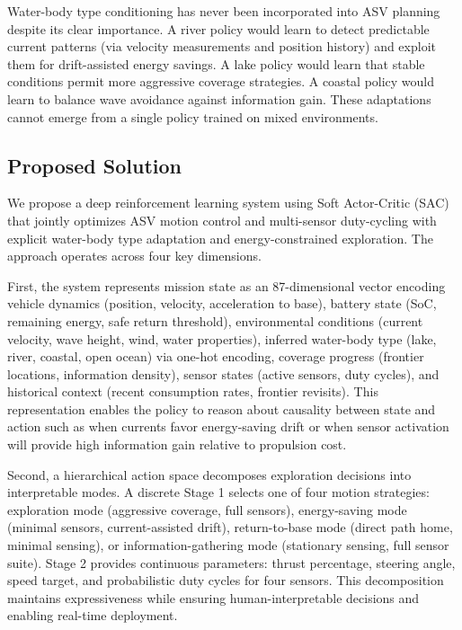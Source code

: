 Water-body type conditioning has never been incorporated into ASV planning despite its clear importance. A river policy would learn to detect predictable current patterns (via velocity measurements and position history) and exploit them for drift-assisted energy savings. A lake policy would learn that stable conditions permit more aggressive coverage strategies. A coastal policy would learn to balance wave avoidance against information gain. These adaptations cannot emerge from a single policy trained on mixed environments.

\subsection{Proposed Solution}

We propose a deep reinforcement learning system using Soft Actor-Critic (SAC) that jointly optimizes ASV motion control and multi-sensor duty-cycling with explicit water-body type adaptation and energy-constrained exploration. The approach operates across four key dimensions.

First, the system represents mission state as an 87-dimensional vector encoding vehicle dynamics (position, velocity, acceleration to base), battery state (SoC, remaining energy, safe return threshold), environmental conditions (current velocity, wave height, wind, water properties), inferred water-body type (lake, river, coastal, open ocean) via one-hot encoding, coverage progress (frontier locations, information density), sensor states (active sensors, duty cycles), and historical context (recent consumption rates, frontier revisits). This representation enables the policy to reason about causality between state and action such as when currents favor energy-saving drift or when sensor activation will provide high information gain relative to propulsion cost.

Second, a hierarchical action space decomposes exploration decisions into interpretable modes. A discrete Stage 1 selects one of four motion strategies: exploration mode (aggressive coverage, full sensors), energy-saving mode (minimal sensors, current-assisted drift), return-to-base mode (direct path home, minimal sensing), or information-gathering mode (stationary sensing, full sensor suite). Stage 2 provides continuous parameters: thrust percentage, steering angle, speed target, and probabilistic duty cycles for four sensors. This decomposition maintains expressiveness while ensuring human-interpretable decisions and enabling real-time deployment.

